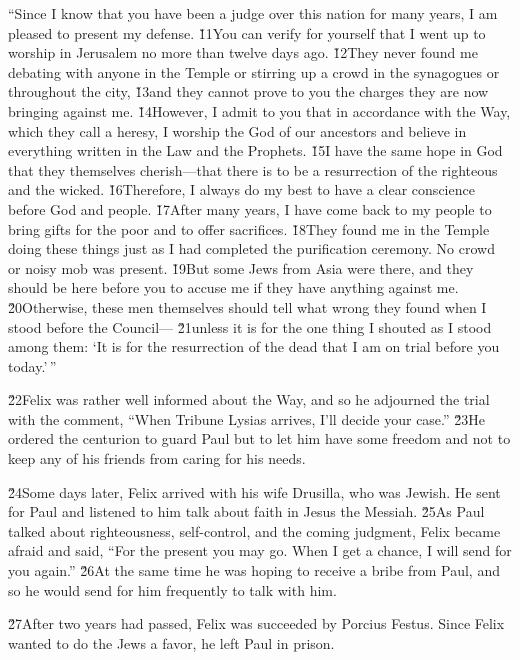 ``Since I know that you have been a judge over this nation for many years, I am pleased to present my defense. \v{11}You can verify for yourself that I went up to worship in Jerusalem no more than twelve days ago. \v{12}They never found me debating with anyone in the Temple or stirring up a crowd in the synagogues or throughout the city, \v{13}and they cannot prove to you the charges they are now bringing against me. \v{14}However, I admit to you that in accordance with the Way, which they call a heresy, I worship the God of our ancestors and believe in everything written in the Law and the Prophets. \v{15}I have the same hope in God that they themselves cherish---that there is to be a resurrection of the righteous and the wicked. \v{16}Therefore, I always do my best to have a clear conscience before God and people. \v{17}After many years, I have come back to my people to bring gifts for the poor and to offer sacrifices. \v{18}They found me in the Temple doing these things just as I had completed the purification ceremony. No crowd or noisy mob was present. \v{19}But some Jews from Asia were there, and they should be here before you to accuse me if they have anything against me. \v{20}Otherwise, these men themselves should tell what wrong they found when I stood before the Council--- \v{21}unless it is for the one thing I shouted as I stood among them: `It is for the resurrection of the dead that I am on trial before you today.'\,''

\v{22}Felix was rather well informed about the Way, and so he adjourned the trial with the comment, ``When Tribune Lysias arrives, I'll decide your case.'' \v{23}He ordered the centurion to guard Paul but to let him have some freedom and not to keep any of his friends from caring for his needs.

\v{24}Some days later, Felix arrived with his wife Drusilla, who was Jewish. He sent for Paul and listened to him talk about faith in Jesus the Messiah. \v{25}As Paul talked about righteousness, self-control, and the coming judgment, Felix became afraid and said, ``For the present you may go. When I get a chance, I will send for you again.'' \v{26}At the same time he was hoping to receive a bribe from Paul, and so he would send for him frequently to talk with him.

\v{27}After two years had passed, Felix was succeeded by Porcius Festus. Since Felix wanted to do the Jews a favor, he left Paul in prison.

